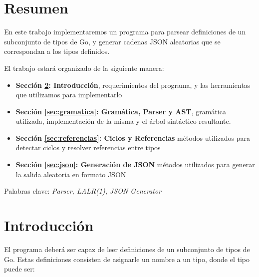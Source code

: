 \section{Resumen}

En este trabajo implementaremos un programa para parsear definiciones de un subconjunto de tipos de Go, y generar cadenas JSON aleatorias que se correspondan a los tipos definidos.

El trabajo estará organizado de la siguiente manera:

\begin{itemize}
	\item \textbf{Sección \ref{sec:intro}: Introducción}, requerimientos del programa, y las herramientas que utilizamos para implementarlo
	\item \textbf{Sección \ref{sec:gramatica}: Gramática, Parser y AST}, gramática utilizada, implementación de la misma y el árbol sintáctico resultante.
	\item \textbf{Sección \ref{sec:referencias}: Ciclos y Referencias} métodos utilizados para detectar ciclos y resolver referencias entre tipos
	\item \textbf{Sección \ref{sec:json}: Generación de JSON} métodos utilizados para generar la salida aleatoria en formato JSON
\end{itemize}

Palabras clave: \textit{Parser, LALR(1), JSON Generator}

\newpage

\section{Introducción}
\label{sec:intro}

El programa deberá ser capaz de leer definiciones de un subconjunto de tipos de Go. Estas definiciones consisten de asignarle un nombre a un tipo, donde el tipo puede ser:

